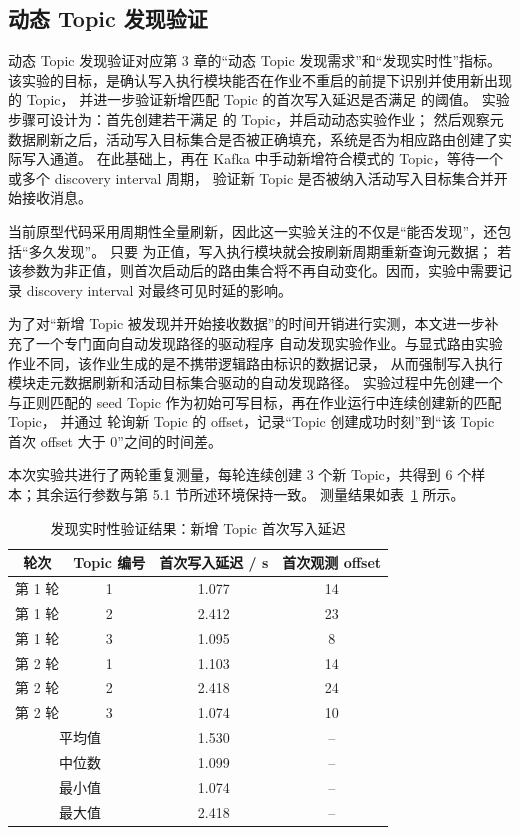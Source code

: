 \subsection{动态 Topic 发现验证}

动态 Topic 发现验证对应第 3 章的“动态 Topic 发现需求”和“发现实时性”指标。
该实验的目标，是确认写入执行模块能否在作业不重启的前提下识别并使用新出现的 Topic，
并进一步验证新增匹配 Topic 的首次写入延迟是否满足  的阈值。
实验步骤可设计为：首先创建若干满足  的 Topic，并启动动态实验作业；
然后观察元数据刷新之后，活动写入目标集合是否被正确填充，系统是否为相应路由创建了实际写入通道。
在此基础上，再在 Kafka 中手动新增符合模式的 Topic，等待一个或多个 discovery interval 周期，
验证新 Topic 是否被纳入活动写入目标集合并开始接收消息。

当前原型代码采用周期性全量刷新，因此这一实验关注的不仅是“能否发现”，还包括“多久发现”。
只要  为正值，写入执行模块就会按刷新周期重新查询元数据；
若该参数为非正值，则首次启动后的路由集合将不再自动变化。因而，实验中需要记录 discovery interval 对最终可见时延的影响。

为了对“新增 Topic 被发现并开始接收数据”的时间开销进行实测，本文进一步补充了一个专门面向自动发现路径的驱动程序
自动发现实验作业。与显式路由实验作业不同，该作业生成的是不携带逻辑路由标识的数据记录，
从而强制写入执行模块走元数据刷新和活动目标集合驱动的自动发现路径。
实验过程中先创建一个与正则匹配的 seed Topic 作为初始可写目标，再在作业运行中连续创建新的匹配 Topic，
并通过  轮询新 Topic 的 offset，记录“Topic 创建成功时刻”到“该 Topic 首次 offset 大于 0”之间的时间差。

本次实验共进行了两轮重复测量，每轮连续创建 3 个新 Topic，共得到 6 个样本；其余运行参数与第 5.1 节所述环境保持一致。
测量结果如表~\ref{tab:auto-discovery-latency} 所示。

\begin{table}[htbp]
  \centering
  \caption{发现实时性验证结果：新增 Topic 首次写入延迟}
  \label{tab:auto-discovery-latency}
  \begin{tabular}{cccc}
    \toprule
    轮次 & Topic 编号 & 首次写入延迟 / s & 首次观测 offset \\
    \midrule
    第 1 轮 & 1 & 1.077 & 14 \\
    第 1 轮 & 2 & 2.412 & 23 \\
    第 1 轮 & 3 & 1.095 & 8 \\
    第 2 轮 & 1 & 1.103 & 14 \\
    第 2 轮 & 2 & 2.418 & 24 \\
    第 2 轮 & 3 & 1.074 & 10 \\
    \midrule
    \multicolumn{2}{c}{平均值} & 1.530 & -- \\
    \multicolumn{2}{c}{中位数} & 1.099 & -- \\
    \multicolumn{2}{c}{最小值} & 1.074 & -- \\
    \multicolumn{2}{c}{最大值} & 2.418 & -- \\
    \bottomrule
  \end{tabular}
\end{table}

